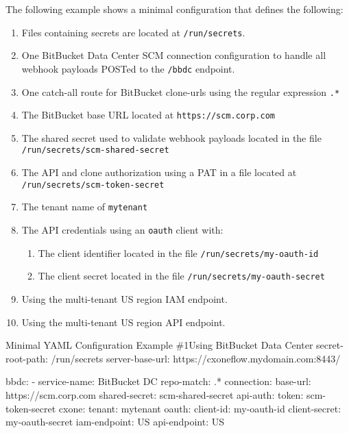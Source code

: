 The following example shows a minimal \cxoneflow configuration that defines the following:

\begin{enumerate}
    \item Files containing secrets are located at \texttt{/run/secrets}.
    \item One BitBucket Data Center SCM connection configuration to handle all webhook payloads
    POSTed to the \texttt{/bbdc} endpoint.
    \item One catch-all route for BitBucket clone-urls using the regular expression \texttt{.*}
    \item The BitBucket base URL located at \texttt{https://scm.corp.com}
    \item The shared secret used to validate webhook payloads located in the file \texttt{/run/secrets/scm-shared-secret}
    \item The API and clone authorization using a PAT in a file located at \texttt{/run/secrets/scm-token-secret}
    \item The \cxone tenant name of \texttt{mytenant}
    \item The \cxone API credentials using an \texttt{oauth} client with:
    \begin{enumerate}
        \item The client identifier located in the file \texttt{/run/secrets/my-oauth-id}
        \item The client secret located in the file \texttt{/run/secrets/my-oauth-secret}
    \end{enumerate}
    \item Using the \cxone multi-tenant US region IAM endpoint.
    \item Using the \cxone multi-tenant US region API endpoint.
\end{enumerate}

\begin{code}{Minimal YAML Configuration Example \#1}{Using BitBucket Data Center}{}
secret-root-path: /run/secrets
server-base-url: https://cxoneflow.mydomain.com:8443/

bbdc:
    - service-name: BitBucket DC
      repo-match: .*
      connection:
        base-url: https://scm.corp.com
        shared-secret: scm-shared-secret
        api-auth:
          token: scm-token-secret
      cxone:
        tenant: mytenant
        oauth:
          client-id: my-oauth-id
          client-secret: my-oauth-secret
        iam-endpoint: US
        api-endpoint: US
\end{code}

